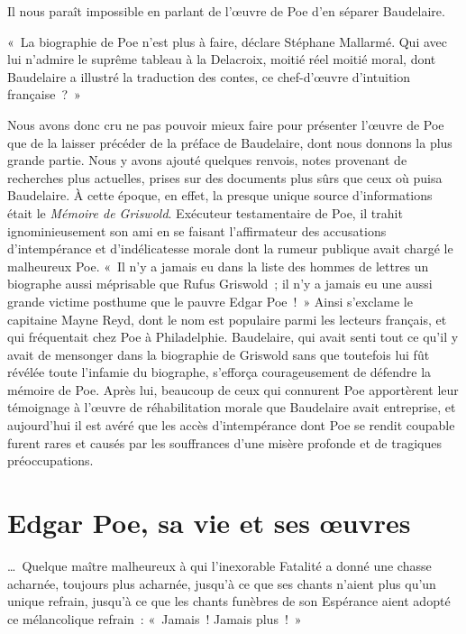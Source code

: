 \documentclass[french,twoside]{book} %
\newcommand{\byline}[1]{\bigskip{\RaggedLeft{#1}\par}\bigskip}
\begin{document}
Il nous paraît impossible en parlant de l’œuvre de Poe d’en séparer Baudelaire.\par
« La biographie de Poe n’est plus à faire, déclare Stéphane Mallarmé. Qui avec lui n’admire le suprême tableau à la Delacroix, moitié réel moitié moral, dont Baudelaire a illustré la traduction des contes, ce chef-d’œuvre d’intuition française ? »\par
Nous avons donc cru ne pas pouvoir mieux faire pour présenter l’œuvre de Poe que de la laisser précéder de la préface de Baudelaire, dont nous donnons la plus grande partie. Nous y avons ajouté quelques renvois, notes provenant de recherches plus actuelles, prises sur des documents plus sûrs que ceux où puisa Baudelaire. À cette époque, en effet, la presque unique source d’informations était le \emph{Mémoire de Griswold}. Exécuteur testamentaire de Poe, il trahit ignominieusement son ami en se faisant l’affirmateur des accusations d’intempérance et d’indélicatesse morale dont la rumeur publique avait chargé le malheureux Poe. « Il n’y a jamais eu dans la liste des hommes de lettres un biographe aussi méprisable que Rufus Griswold ; il n’y a jamais eu une aussi grande victime posthume que le pauvre Edgar Poe ! » Ainsi s’exclame le capitaine Mayne Reyd, dont le nom est populaire parmi les lecteurs français, et qui fréquentait chez Poe à Philadelphie. Baudelaire, qui avait senti tout ce qu’il y avait de mensonger dans la biographie de Griswold sans que toutefois lui fût révélée toute l’infamie du biographe, s’efforça courageusement de défendre la mémoire de Poe. Après lui, beaucoup de ceux qui connurent Poe apportèrent leur témoignage à l’œuvre de réhabilitation morale que Baudelaire avait entreprise, et aujourd’hui il est avéré que les accès d’intempérance dont Poe se rendit coupable furent rares et causés par les souffrances d’une misère profonde et de tragiques préoccupations.
\section[{Edgar Poe, sa vie et ses œuvres}]{Edgar Poe, sa vie et ses œuvres}\renewcommand{\leftmark}{Edgar Poe, sa vie et ses œuvres}


\byline{par Charles Baudelaire.}
\noindent … Quelque maître malheureux à qui l’inexorable Fatalité a donné une chasse acharnée, toujours plus acharnée, jusqu’à ce que ses chants n’aient plus qu’un unique refrain, jusqu’à ce que les chants funèbres de son Espérance aient adopté ce mélancolique refrain : « Jamais ! Jamais plus ! »\par
\end{document}

